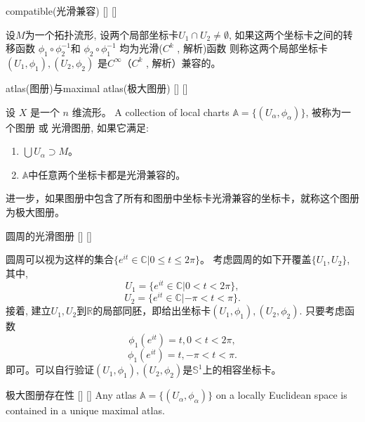 \documentclass[UTF8]{ctexart}
\begin{document}
    \begin{dfn}
        []
        {compatible(光滑兼容)}
        []
        []

        设$M$为一个拓扑流形,
        设两个局部坐标卡$ U_1 \cap U_2 \neq \emptyset $,
        如果这两个坐标卡之间的转移函数
        $ \phi_1 \circ \phi_2^{-1} $和
        $ \phi_2 \circ \phi_1^{-1} $
        均为光滑($C^k$ , 解析)函数
        则称这两个局部坐标卡$ (U_1 , \phi_1), (U_2 , \phi_2) $ 是$C^{\infty}$（$C^k$ , 解析）兼容的。
    \end{dfn}

    \begin{dfn}
        []
        {atlas(图册)与maximal atlas(极大图册)}
        []
        []

        设 $X$ 是一个 $n$ 维流形。 
        A collection of local charts 
        $\mathbb{A} = \{(U_{\alpha},\phi_{\alpha})\}$,
        被称为一个图册 或 光滑图册, 
        如果它满足:
         \begin{enumerate}
             \item $\bigcup U_{\alpha} \supset M$。
             \item $\mathbb{A}$中任意两个坐标卡都是光滑兼容的。
         \end{enumerate}
    进一步，如果图册中包含了所有和图册中坐标卡光滑兼容的坐标卡，就称这个图册为极大图册。
    \end{dfn}

    \begin{xmp}
        []
        {圆周的光滑图册}
        []
        []

        圆周可以视为这样的集合$\{ e^{it} \in \mathbb{C} | 0 \leq t \leq 2 \pi \}$。
        考虑圆周的如下开覆盖$\{U_1 , U_2\}$, 其中, 
        \[
        U_1 = \{ e^{it} \in \mathbb{C} | 0 < t < 2 \pi \},
        \]
        \[
        U_2 = \{ e^{it} \in \mathbb{C} | -\pi < t < \pi \}.
        \]
        接着, 建立$U_1 , U_2$到$\mathbb{R}$的局部同胚，即给出坐标卡$(U_1,\phi_1), (U_2, \phi_2)$. 只要考虑函数
        \[
        \phi_1(e^{it}) = t , 0 < t < 2 \pi,
        \]
        \[
        \phi_1(e^{it}) = t , -\pi < t < \pi.
        \]
        即可。可以自行验证$(U_1,\phi_1), (U_2, \phi_2)$是$\mathbb{S}^1$上的相容坐标卡。
        
    \end{xmp}
    
    \begin{ppt}
        []
        {极大图册存在性}
        []
        []
        Any atlas $\mathbb{A} = \{(U_{\alpha},\phi_{\alpha})\}$ on a locally Euclidean space is contained in a unique maximal atlas.
    \end{ppt}
    
\end{document}
